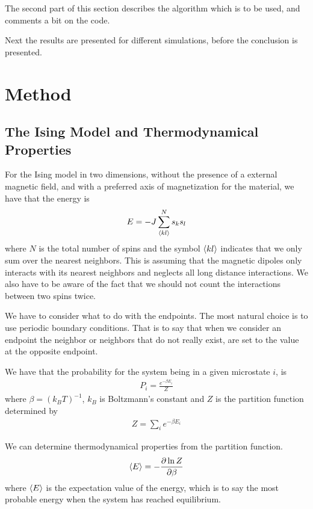 \documentclass[11pt, a4paper]{article}
\newcommand{\pdiff}[2]{\frac{\partial #1}{\partial #2}}
\begin{document}
The second part of this section describes the algorithm which is to be used, and comments a bit on the code.

Next the results are presented for different simulations, before the conclusion is presented.    

\section{Method}
\subsection{The Ising Model and Thermodynamical Properties}
For the Ising model in two dimensions, without the presence of a external magnetic field, and with a preferred axis of magnetization for the material, we have that the energy is
\begin{gather}
E = -J\sum\limits_{\braket{kl}}^N s_ks_l
\label{eq:main_energy}
\end{gather}
where $N$ is the total number of spins and the symbol $\braket{kl}$ indicates that we only sum over the nearest neighbors. This is assuming that the magnetic dipoles only interacts with its nearest neighbors and neglects all long distance interactions. We also have to be aware of the fact that we should not count the interactions between two spins twice. 

We have to consider what to do with the endpoints. The most natural choice is to use periodic boundary conditions. That is to say that when we consider an endpoint the neighbor or neighbors that do not really exist, are set to the value at the opposite endpoint.

We have that the probability for the system being in a given microstate $i$, is 
\begin{gather}
P_i = \frac{e^{-\beta E_i}}{Z}
\end{gather}
where $\beta=(k_BT)^{-1}$, $k_B$ is Boltzmann's constant and $Z$ is the partition function determined by
\begin{gather}
Z = \sum\limits_i e^{-\beta E_i}
\label{eq:main_partition}
\end{gather}

We can determine thermodynamical properties from the partition function. 
\begin{gather}
\braket{E} = -\pdiff{\ln Z}{\beta}
\label{eq:energy}
\end{gather}
where $\braket{E}$ is the expectation value of the energy, which is to say the most probable energy when the system has reached equilibrium. 
\end{document}
